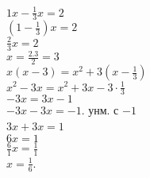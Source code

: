 \documentclass{article}
\theoremstyle{plain}
\begin{document}
$1x - \frac{1}{3}x = 2 $\\
$(1-\frac{1}{3})x = 2 $\\
$\frac{2}{3}x = 2 $ \\
$x = \frac{2.3}{2} = 3  $
\\


$ x(x-3 ) = x^2 +3(x-\frac{1}{3})$ \\
$x^2 - 3x = x^2 + 3x - 3\cdot\frac{1}{3}$ \\
$-3x = 3x -1 $ \\
$ -3x -3x = -1  $. унм. с  $-1 $ \\
 $ 3x + 3x = 1 $
$  $ \\
$6x = 1 $\\
$\frac{6}{1}x = \frac{1}{1} $\\
$x = \frac{1}{6} $.
\end{document}
